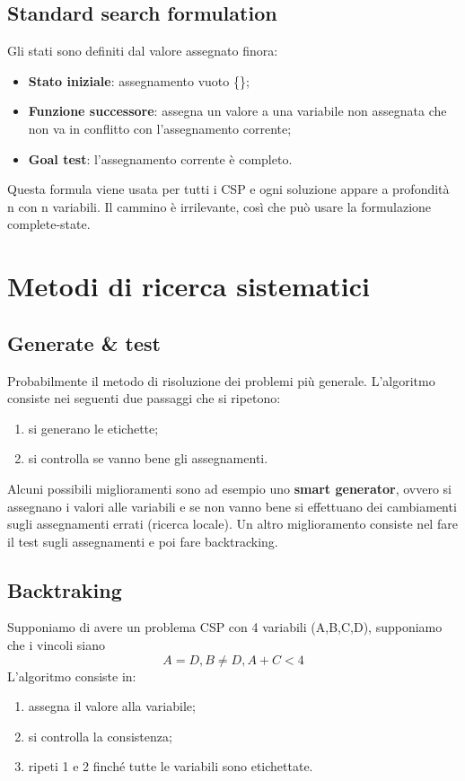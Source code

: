 \subsection{Standard search formulation }
Gli stati sono definiti dal valore assegnato finora:
\begin{itemize}
    \item \textbf{Stato iniziale}: assegnamento vuoto \{\};
    \item \textbf{Funzione successore}: assegna un valore a una variabile non assegnata che non va in conflitto con l'assegnamento corrente;
    \item \textbf{Goal test}: l'assegnamento corrente è completo.
\end{itemize}
Questa formula viene usata per tutti i CSP e ogni soluzione appare a profondità n con n variabili. Il cammino è irrilevante, così che può usare la formulazione complete-state.


\section{Metodi di ricerca sistematici}
\subsection{Generate \& test}
Probabilmente il metodo di risoluzione dei problemi più generale. L'algoritmo consiste nei seguenti due passaggi che si ripetono:
\begin{enumerate}
    \item si generano le etichette;
    \item si controlla se vanno bene gli assegnamenti.
\end{enumerate}
Alcuni possibili miglioramenti sono ad esempio uno \textbf{smart generator}, ovvero si assegnano i valori alle variabili e se non vanno bene si effettuano dei cambiamenti sugli assegnamenti errati (ricerca locale). Un altro miglioramento consiste nel fare il test sugli assegnamenti e poi fare backtracking. 
\subsection{Backtraking}
Supponiamo di avere un problema CSP con 4 variabili (A,B,C,D), supponiamo che i vincoli siano 
\[A=D, B \neq D, A+C < 4\]
L'algoritmo consiste in:
\begin{enumerate}
    \item assegna il valore alla variabile;
    \item si controlla la consistenza;
    \item ripeti 1 e 2 finché tutte le variabili sono etichettate.
\end{enumerate}

